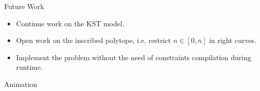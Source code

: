 \documentclass[shortpres,aspectratio=43]{beamer}
\begin{document}
\begin{frame}{Future Work}
  \begin{itemize}
    \item Continue work on the KST model.
    \item Open work on the inscribed polytope, i.e. restrict $n\in[0,\overline{n}]$ in right curves.
    \item Implement the problem without the need of constraints compilation during runtime.
  \end{itemize}
\end{frame}

\begin{frame}{Animation}
\end{frame}
\end{document}

